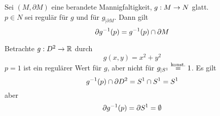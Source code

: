 \Lem{}
Sei $(M, \partial M)$ eine berandete Mannigfaltigkeit, $g : M\overset{}{\rightarrow} N$ glatt.\\
$p \in N$ sei regulär für $g$ und für $g_{|\partial M}$. Dann gilt
\[ \partial g^{-1}(p) = g^{-1}(p) \cap \partial M \]

\Bsp{}
Betrachte $g:D^2 \overset{}{\rightarrow} \mathbb{R}$ durch
\[ g(x,y)  = x^2 + y^2 \]
$p = 1$ ist ein regulärer Wert für $g$, aber nicht für $g_{|S^1} \overset{\text{konst.}}{=} 1$. Es gilt
\[ g^{-1}(p) \cap \partial D^2 = S^1 \cap S^1 = S^1 \]
aber
\[ \partial g^{-1}(p) = \partial S^1 = \emptyset \]